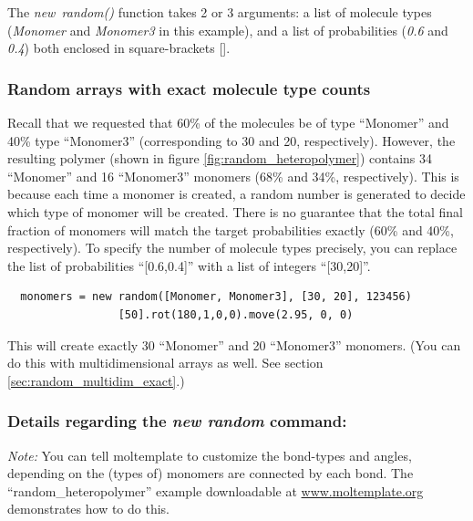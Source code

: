 \documentclass[11pt]{article}
\begin{document}


The \mbox{\textit{new random()}} function takes 2 or 3 arguments:
a list of molecule types 
(\mbox{\textit{Monomer}} and \mbox{\textit{Monomer3}} in this example),
and a list of probabilities (\textit{0.6} and \textit{0.4})
both enclosed in square-brackets [].

\subsubsection{Random arrays with exact molecule type counts}
\label{sec:random_exact}
Recall that we requested that 60\% of the molecules be of type
``Monomer'' and 40\% type ``Monomer3'' (corresponding to 30 and 20, respectively).
However, the resulting polymer (shown in figure \ref{fig:random_heteropolymer})
contains 34 ``Monomer'' and 16 ``Monomer3'' monomers (68\% and 34\%, respectively).
This is because each time a monomer is created, a random number is generated
to decide which type of monomer will be created.
There is no guarantee that the total final fraction of monomers will 
match the target probabilities exactly (60\% and 40\%, respectively).
To specify the number of molecule types precisely, you can replace 
the list of probabilities ``[0.6,0.4]''
with a list of integers ``[30,20]''.
\begin{verbatim}
  monomers = new random([Monomer, Monomer3], [30, 20], 123456)
                 [50].rot(180,1,0,0).move(2.95, 0, 0)
\end{verbatim}
This will create exactly 30 ``Monomer'' and 20 ``Monomer3'' monomers.
(You can do this with multidimensional arrays as well.  
See section \ref{sec:random_multidim_exact}.)


\subsubsection*{Details regarding the \textit{new random} command:}

\textit{Note:} You can tell moltemplate to customize the bond-types and 
              angles, depending on the (types of) monomers are connected
              by each bond.  The ``random\_heteropolymer'' example
              downloadable at \url{www.moltemplate.org} demonstrates
              how to do this.
\end{document}
